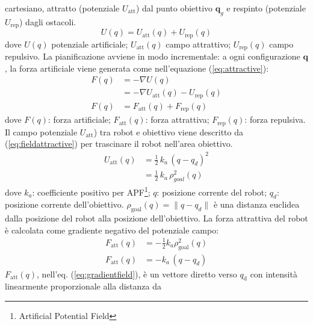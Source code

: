 cartesiano, attratto (potenziale $U_{\text{att}}$) dal punto obiettivo 
$\mathbf{q}_g$ e respinto (potenziale $U_{\text{rep}}$) dagli ostacoli.
\begin{equation}
\label{eq:apfm}
U(q) = U_{\text{att}}(q) + U_{\text{rep}}(q)
\end{equation}
%
\noindent dove $U(q)$ potenziale artificiale; $U_{\text{att}}(q)$ campo 
attrattivo; $U_{\text{rep}}(q)$ campo repulsivo.
La pianificazione avviene in modo incrementale: a ogni configurazione 
$\mathbf{q}$, la forza artificiale viene generata come nell'equazione (\ref{eq:attractive}):
\begin{equation}
\label{eq:attractive}
\begin{split}
F(q) &= - \nabla U(q)\\
&= - \nabla U_{\text{att}}(q) -U_{\text{rep}}(q)\\
F(q) &= F_{\text{att}}(q) + F_{\text{rep}}(q)	
\end{split}
\end{equation}
dove $F(q)$: forza artificiale; $F_{\text{att}}(q)$: forza attrattiva; 
$F_{\text{rep}}(q)$: forza repulsiva. Il campo potenziale $U_{\text{att}}$) tra 
robot e obiettivo viene descritto da (\ref{eq:fieldattractive}) per trascinare 
il robot nell'area obiettivo.
\begin{equation}
\label{eq:fieldattractive}
\begin{split}
U_{\text{att}}(q) &= \frac{1}{2} \, k_a \, (q-q_d)^2\\
&= \frac{1}{2} \, k_a \, \rho^{2}_{goal}(q)
\end{split}
\end{equation}
dove $k_a$: coefficiente positivo per APF\footnote{Artificial Potential Field};
$q$: posizione corrente del robot; $q_{d}$: posizione corrente dell'obiettivo.
$\rho_{\text{goal}}(q) = \|q-q_{d}\|$ è una distanza euclidea dalla posizione 
del robot alla posizione dell'obiettivo. La forza attrattiva del robot è 
calcolata come gradiente negativo del potenziale campo\cite{6283526}:
\begin{equation}
\label{eq:gradientfield}
\begin{split}
F_{\text{att}}(q) &= -\frac{1}{2}k_a \rho^2_{\text{goal}}(q)\\
F_{\text{att}}(q) &= -k_a \, (q-q_d)
\end{split}
\end{equation}
%
$F_{\text{att}}(q)$, nell'eq. (\ref{eq:gradientfield}), è un vettore diretto 
verso $q_{\text{d}}$ con intensità linearmente proporzionale alla distanza da 

